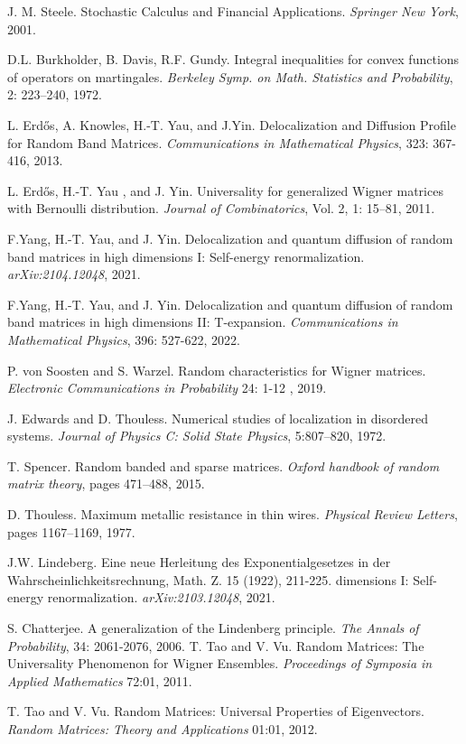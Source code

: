 \documentclass[11pt]{article}
\begin{document}
\begin{thebibliography}{99}
 J. M. Steele. Stochastic Calculus and Financial Applications.\textit{ Springer New York}, 2001.

 D.L. Burkholder, B. Davis, R.F. Gundy. Integral inequalities for convex functions of operators on martingales. \textit{Berkeley Symp. on Math. Statistics and Probability}, 2: 223–240, 1972.

 L. Erdős, A. Knowles, H.-T. Yau, and J.Yin. Delocalization and Diffusion Profile for Random Band Matrices. \textit{Communications in Mathematical Physics}, 323: 367-416, 2013.

 L. Erdős, H.-T. Yau , and J. Yin. Universality for generalized Wigner matrices with Bernoulli distribution. \textit{Journal of Combinatorics}, Vol. 2, 1: 15–81, 2011.

 F.Yang, H.-T. Yau, and J. Yin. Delocalization and quantum diffusion of random band matrices in high dimensions I: Self-energy renormalization. \textit{arXiv:2104.12048}, 2021.

 F.Yang, H.-T. Yau, and J. Yin. Delocalization and quantum diffusion of random band matrices in high dimensions II: T-expansion. \textit{Communications in Mathematical Physics}, 396: 527-622, 2022.

 P. von Soosten and S. Warzel. Random characteristics for Wigner matrices.  \textit{Electronic Communications in Probability} 24: 1-12 , 2019.

 J. Edwards and D. Thouless. Numerical studies of localization in disordered systems. \textit{Journal of Physics
C: Solid State Physics}, 5:807–820, 1972.

 T. Spencer. Random banded and sparse matrices. \textit{Oxford handbook of random matrix theory}, pages
471–488, 2015.

 D. Thouless. Maximum metallic resistance in thin wires. \textit{Physical Review Letters}, pages 1167–1169,
1977.


 J.W. Lindeberg. Eine neue Herleitung des Exponentialgesetzes in der Wahrscheinlichkeitsrechnung, Math. Z. 15 (1922), 211-225. 
dimensions I: Self-energy renormalization. \textit{arXiv:2103.12048}, 2021.

 S. Chatterjee. A generalization of the Lindenberg principle. \textit{The Annals of Probability}, 34: 2061-2076, 2006.
 T. Tao and V. Vu. Random Matrices: The Universality Phenomenon for Wigner Ensembles. \textit{ Proceedings of Symposia in Applied Mathematics} 72:01, 2011.

 T. Tao and V. Vu. Random Matrices: Universal Properties of Eigenvectors. \textit{Random Matrices: Theory and Applications} 01:01, 2012.


\end{thebibliography}
\end{document}
